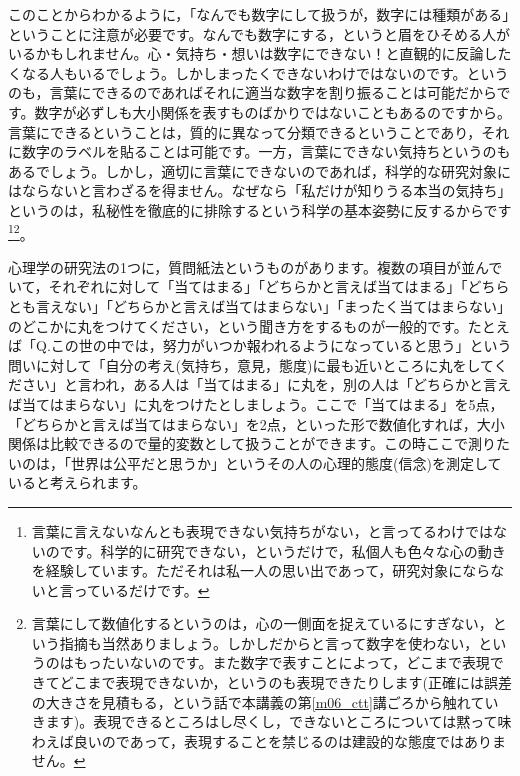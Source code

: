 \documentclass{ltjsbook}
\begin{document}
このことからわかるように，「なんでも数字にして扱うが，数字には種類がある」ということに注意が必要です。なんでも数字にする，というと眉をひそめる人がいるかもしれません。心・気持ち・想いは数字にできない！と直観的に反論したくなる人もいるでしょう。しかしまったくできないわけではないのです。というのも，言葉にできるのであればそれに適当な数字を割り振ることは可能だからです。数字が必ずしも大小関係を表すものばかりではないこともあるのですから。言葉にできるということは，質的に異なって分類できるということであり，それに数字のラベルを貼ることは可能です。一方，言葉にできない気持ちというのもあるでしょう。しかし，適切に言葉にできないのであれば，科学的な研究対象にはならないと言わざるを得ません。なぜなら「私だけが知りうる本当の気持ち」というのは，私秘性を徹底的に排除するという科学の基本姿勢に反するからです\footnote{言葉に言えないなんとも表現できない気持ちがない，と言ってるわけではないのです。科学的に研究できない，というだけで，私個人も色々な心の動きを経験しています。ただそれは私一人の思い出であって，研究対象にならないと言っているだけです。}\footnote{言葉にして数値化するというのは，心の一側面を捉えているにすぎない，という指摘も当然ありましょう。しかしだからと言って数字を使わない，というのはもったいないのです。また数字で表すことによって，どこまで表現できてどこまで表現できないか，というのも表現できたりします(正確には誤差の大きさを見積もる，という話で本講義の第\ref{m06_ctt}講ごろから触れていきます)。表現できるところはし尽くし，できないところについては黙って味わえば良いのであって，表現することを禁じるのは建設的な態度ではありません。}。

心理学の研究法の1つに，質問紙法というものがあります。複数の項目が並んでいて，それぞれに対して「当てはまる」「どちらかと言えば当てはまる」「どちらとも言えない」「どちらかと言えば当てはまらない」「まったく当てはまらない」のどこかに丸をつけてください，という聞き方をするものが一般的です。たとえば「Q.この世の中では，努力がいつか報われるようになっていると思う」という問いに対して「自分の考え(気持ち，意見，態度)に最も近いところに丸をしてください」と言われ，ある人は「当てはまる」に丸を，別の人は「どちらかと言えば当てはまらない」に丸をつけたとしましょう。ここで「当てはまる」を5点，「どちらかと言えば当てはまらない」を2点，といった形で数値化すれば，大小関係は比較できるので量的変数として扱うことができます。この時ここで測りたいのは，「世界は公平だと思うか」というその人の心理的態度(信念)を測定していると考えられます。
\end{document}
